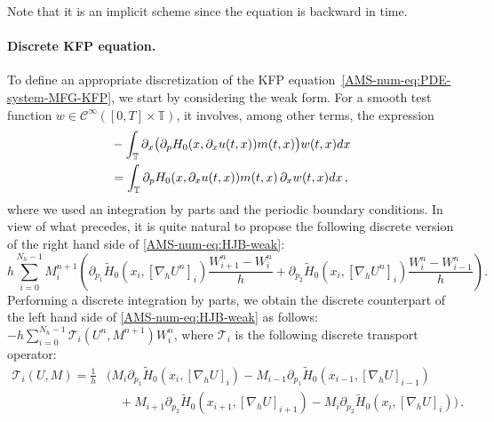 \documentclass{amsproc}
\theoremstyle{definition}
\theoremstyle{remark}
\numberwithin{equation}{section}
\newcommand{\TT}{{\mathbb T}}
\newcommand{\grad}{\nabla}
\begin{document}
Note that it is an implicit scheme since the equation is backward in time.



\paragraph{\textbf{Discrete KFP equation.} } \label{AMS-num-sec:textbfd-kfp-equat}
To define an appropriate discretization of the KFP equation~\eqref{AMS-num-eq:PDE-system-MFG-KFP}, we start by considering the weak form. For a smooth test function $w \in \mathcal{C}^{\infty}([0,T] \times \TT)$, it involves, among other terms,  the expression
\begin{align}
	&- \int_{\TT} \partial_x \big( \partial_p H_0(x, \partial_x u(t,x)) m(t,x)\big) w(t,x) dx
	\notag
	\\
	&=
	\int_{\TT} \partial_p H_0(x, \partial_x u(t,x)) m(t,x) \, \partial_x w(t,x) dx  \, ,
	\label{AMS-num-eq:HJB-weak}
\end{align}
where we used an integration by parts and the periodic boundary conditions. In view of what precedes, it is quite natural to propose the following discrete version of the right hand side of \eqref{AMS-num-eq:HJB-weak}:
\begin{displaymath}
 h \sum_{i=0}^{N_h-1} M_i^{n+1} \left(  \partial_{p_1} \tilde{H}_0(x_i, [\grad_h U^n]_i)  \frac { W^n_{i+1}-W^n_i} h+
    \partial_{p_2} \tilde{H}_0(x_i, [\grad_h U^n]_i)  \frac { W^n_{i}-W^n_{i-1}} h   \right).
\end{displaymath}
Performing a discrete integration by parts, we obtain the discrete counterpart  of the left hand side of \eqref{AMS-num-eq:HJB-weak} as follows:
$ \displaystyle -
  h \sum_{i=0}^{N_h-1}  	\mathcal{T}_i(U^n , M^{n+1}) W_i^n$,
where $\mathcal{T}_i$ is the following discrete transport operator:
\begin{align*}
	\mathcal{T}_i(U, M)
	= \frac{1}{h} 
	&\Big( M_i  \partial_{p_1} \tilde{H}_0(x_i, [\grad_h U]_i) 
		- M_{i-1} \partial_{p_1} \tilde{H}_0(x_{i-1}, [\grad_h U]_{i-1})
		\\
		&\quad +
		M_{i+1} \partial_{p_2} \tilde{H}_0(x_{i+1}, [\grad_h U]_{i+1})
		- M_i \partial_{p_2} \tilde{H}_0(x_i, [\grad_h U]_i)
	\Big) \, .
\end{align*}
\end{document}
